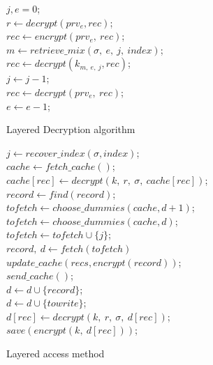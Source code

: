 \documentclass[USenglish,oneside,twocolumn]{article}
\begin{document}
\begin{algorithm}
\DontPrintSemicolon
{}
$j,e=0$;\\
$r\gets decrypt(prv_e,rec)$;\\
{
{
$rec \gets encrypt(prv_e,\ rec)$;\\
{
	$m\gets retrieve\_mix(\sigma,\ e,\ j,\ index)$;\\
	$rec \gets decrypt(k_{m,\ e,\ j}, rec)$;\\
	$j\gets j-1$;\\
}
}
	$rec \gets decrypt(prv_e,\ rec)$;\\
    $e\gets e-1$;\\
}
\caption{Layered Decryption algorithm }
\label{alg:ldec}
\end{algorithm}

\begin{algorithm}
\DontPrintSemicolon
{}
$j \gets recover\_index(\sigma, index)$;\\
$cache \gets fetch\_cache()$;\\
{
$cache[rec]\gets decrypt(k,\ r,\ \sigma,\ cache[rec])$;\\
}
{
$record \gets find(record) $;\\
$tofetch \gets choose\_dummies(cache, d+1)$;\\
}
\Else
{
$tofetch \gets choose\_dummies(cache, d)$;\\
$tofetch \gets tofetch \cup \{j\}$;\\
}
$record,\ d \gets fetch(tofetch)$\\
$update\_cache(recs, encrypt(record))$;\\
$send\_cache()$;\\
{
$d \gets d \cup \{record\}$;\\
}
\Else
{
$d \gets d \cup \{towrite\}$;\\
}
{
$d[rec] \gets decrypt(k,\ r,\ \sigma,\ d[rec])$;\\
$save(encrypt(k,\ d[rec]))$;\\
}
\caption{Layered access method}
\label{alg:pileclient}
\end{algorithm}
\end{document}
